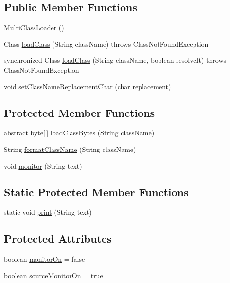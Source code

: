 \subsection*{Public Member Functions}
\begin{DoxyCompactItemize}
\item 
\hyperlink{classorg_1_1jgap_1_1util_1_1_multi_class_loader_a9247aa446a74eddcfd2a23d5c99fd57c}{Multi\-Class\-Loader} ()
\item 
Class \hyperlink{classorg_1_1jgap_1_1util_1_1_multi_class_loader_a1c2821dc43cd2ca538f9e6ffe41af3f8}{load\-Class} (String class\-Name)  throws Class\-Not\-Found\-Exception 
\item 
synchronized Class \hyperlink{classorg_1_1jgap_1_1util_1_1_multi_class_loader_a7c9fd481b1168cfab217afd7cd5eb428}{load\-Class} (String class\-Name, boolean resolve\-It)  throws Class\-Not\-Found\-Exception 
\item 
void \hyperlink{classorg_1_1jgap_1_1util_1_1_multi_class_loader_ad75cf011f65d3a509f01c81c7236fe82}{set\-Class\-Name\-Replacement\-Char} (char replacement)
\end{DoxyCompactItemize}
\subsection*{Protected Member Functions}
\begin{DoxyCompactItemize}
\item 
abstract byte\mbox{[}$\,$\mbox{]} \hyperlink{classorg_1_1jgap_1_1util_1_1_multi_class_loader_aff9c184aee7c7fb61dd77d55af89f17e}{load\-Class\-Bytes} (String class\-Name)
\item 
String \hyperlink{classorg_1_1jgap_1_1util_1_1_multi_class_loader_af7689792a86ef761cf69e874460969e9}{format\-Class\-Name} (String class\-Name)
\item 
void \hyperlink{classorg_1_1jgap_1_1util_1_1_multi_class_loader_a0ac1e5f6fe5d7e03d0dfe8dc7dd1ac99}{monitor} (String text)
\end{DoxyCompactItemize}
\subsection*{Static Protected Member Functions}
\begin{DoxyCompactItemize}
\item 
static void \hyperlink{classorg_1_1jgap_1_1util_1_1_multi_class_loader_a388e062b31156295786201d4cd9da2f2}{print} (String text)
\end{DoxyCompactItemize}
\subsection*{Protected Attributes}
\begin{DoxyCompactItemize}
\item 
boolean \hyperlink{classorg_1_1jgap_1_1util_1_1_multi_class_loader_a46b81b84025e37993e49b206062260d2}{monitor\-On} = false
\item 
boolean \hyperlink{classorg_1_1jgap_1_1util_1_1_multi_class_loader_a6b48426e9450345d5411286790932b94}{source\-Monitor\-On} = true
\end{DoxyCompactItemize}
